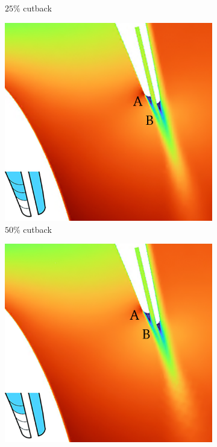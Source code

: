 \documentclass[a4paper, 11pt, oneside]{report}
\begin{document}
\begin{figure}[H]
\begin{subfigure}{.42\textwidth}
		\caption{$25\%$ cutback}
		\vspace{0.018\textheight}
	\end{subfigure}
	\begin{subfigure}{.42\textwidth}
		\centering
		\includegraphics[width=\linewidth]{figs/ps_cutbacks_design_50_ver02.png}
		\caption{$50\%$ cutback}
		\vspace{0.018\textheight}
	\end{subfigure}
	\hspace{0.05\textwidth}
	\begin{subfigure}{.42\textwidth}
		\centering
		\includegraphics[width=\linewidth]{figs/ps_cutbacks_design_75_ver02.png}

\end{subfigure}
\end{figure}
\end{document}
